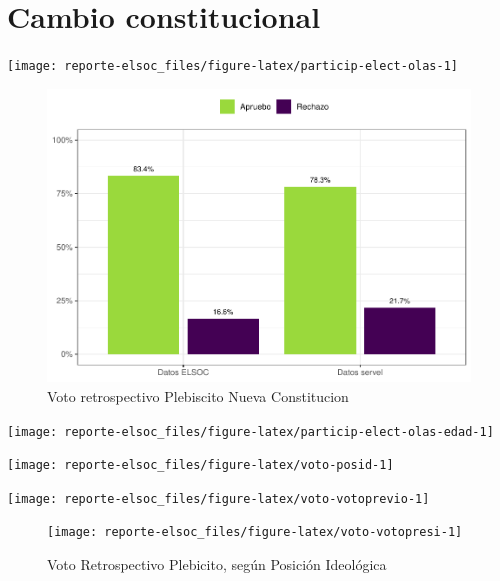 \documentclass[
  12pt,
]{book}
\begin{document}
\hypertarget{cambio-constitucional}{%
\section{Cambio constitucional}\label{cambio-constitucional}}

\begin{center}\texttt{[image: reporte-elsoc\_files/figure-latex/particip-elect-olas-1]} \end{center}

\begin{figure}

{\centering \includegraphics{reporte-elsoc_files/figure-latex/servel-apruebo-1} 

}

\caption{Voto retrospectivo Plebiscito Nueva Constitucion}\label{fig:servel-apruebo}
\end{figure}

\begin{center}\texttt{[image: reporte-elsoc\_files/figure-latex/particip-elect-olas-edad-1]} \end{center}

\begin{center}\texttt{[image: reporte-elsoc\_files/figure-latex/voto-posid-1]} \end{center}

\begin{center}\texttt{[image: reporte-elsoc\_files/figure-latex/voto-votoprevio-1]} \end{center}

\begin{figure}

{\centering \texttt{[image: reporte-elsoc\_files/figure-latex/voto-votopresi-1]} 

}

\caption{Voto Retrospectivo Plebicito, según Posición Ideológica}\label{fig:voto-votopresi}
\end{figure}
\end{document}
